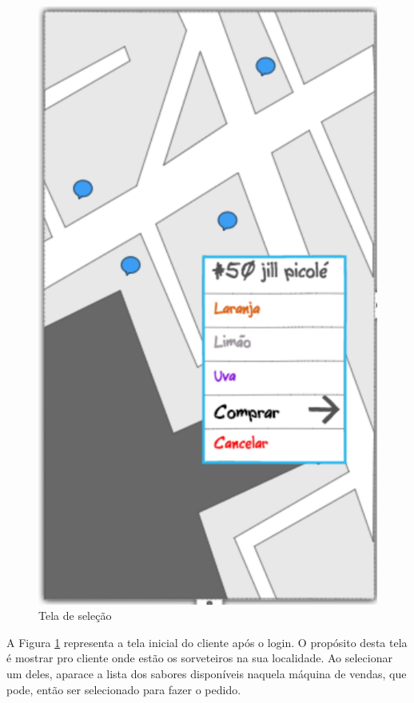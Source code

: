 \begin{figure}[!h]
	\centering
    \includegraphics[scale=0.7]{figuras/home_cliente}
    \caption{Tela de seleção}
    \label{fig:home_page}
\end{figure}

\newpage

A Figura \ref{fig:home_page} representa a tela inicial do cliente após o login. O propósito desta tela é mostrar pro cliente onde estão os sorveteiros na sua localidade. Ao selecionar um deles, aparace a lista dos sabores disponíveis naquela máquina de vendas, que pode, então ser selecionado para fazer o pedido.

